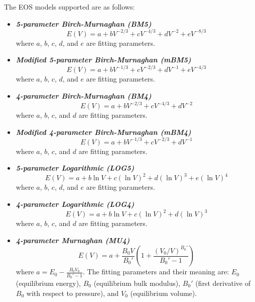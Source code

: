 \documentclass[letter, 12pt]{article}
\begin{document}
The EOS models supported are as follows:
\begin{itemize}
	\item \textbf{\textit{5-parameter Birch-Murnaghan (BM5)}}
	\begin{equation*}
		E(V) = a + bV^{-2/3} + cV^{-4/3} + dV^{-2} + eV^{-8/3}
	\end{equation*}
	where $a$, $b$, $c$, $d$, and $e$ are fitting parameters.
	
	\item \textbf{\textit{Modified 5-parameter Birch-Murnaghan (mBM5)}}
	\begin{equation*}
		E(V) = a + bV^{-1/3} + cV^{-2/3} + dV^{-1} + eV^{-4/3}
	\end{equation*}
	where $a$, $b$, $c$, $d$, and $e$ are fitting parameters.
	
	\item \textbf{\textit{4-parameter Birch-Murnaghan (BM4)}}
	\begin{equation*}
		E(V) = a + bV^{-2/3} + cV^{-4/3} + dV^{-2}
	\end{equation*}
	where $a$, $b$, $c$, and $d$ are fitting parameters.
	
	\item \textbf{\textit{Modified 4-parameter Birch-Murnaghan (mBM4)}}
	\begin{equation*}
		E(V) = a + bV^{-1/3} + cV^{-2/3} + dV^{-1}
	\end{equation*}
	where $a$, $b$, $c$, and $d$ are fitting parameters.
	
	\item \textbf{\textit{5-parameter Logarithmic (LOG5)}}
	\begin{equation*}
		E(V) = a + b\ln V + c(\ln V)^2 + d(\ln V)^3 + e(\ln V)^4
	\end{equation*}
	where $a$, $b$, $c$, $d$, and $e$ are fitting parameters.
	
	\item \textbf{\textit{4-parameter Logarithmic (LOG4)}}
	\begin{equation*}
		E(V) = a + b\ln V + c(\ln V)^2 + d(\ln V)^3
	\end{equation*}
	where $a$, $b$, $c$, and $d$ are fitting parameters.
	
	\item \textbf{\textit{4-parameter Murnaghan (MU4)}}
	\begin{equation*}
		E(V) = a + \frac{B_0V}{B_0'}\left( 1 + \frac{(V_0/V)^{B_0'}}{B_0' - 1} \right)
	\end{equation*}
	where $a = E_0 - \frac{B_0V_0}{B_0' - 1}$. The fitting parameters and their meaning are: $E_0$ (equilibrium energy), $B_0$ (equilibrium bulk modulus), $B_0'$ (first derivative of $B_0$ with respect to pressure), and $V_0$ (equilibrium volume).
	

\end{itemize}
\end{document}
